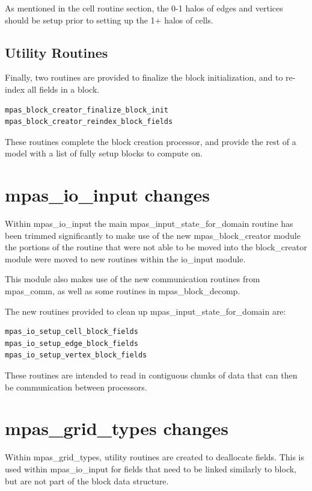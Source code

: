 \documentclass[11pt]{report}
\begin{document}
As mentioned in the cell routine section, the 0-1 halos of edges and vertices should be setup prior to setting up the 1+ halos of cells.

\subsection{Utility Routines}
Finally, two routines are provided to finalize the block initialization, and to re-index all fields in a block.

\begin{lstlisting}[language=fortran,escapechar=@,frame=single]
mpas_block_creator_finalize_block_init
mpas_block_creator_reindex_block_fields
\end{lstlisting}

These routines complete the block creation processor, and provide the rest of a model with a list of fully setup blocks to compute on.

\section{mpas\_io\_input changes}
Within mpas\_io\_input the main mpas\_input\_state\_for\_domain routine has been trimmed significantly to make use of the new mpas\_block\_creator module the portions of the routine that were not able to be moved into the block\_creator module were moved to new routines within the io\_input module.

This module also makes use of the new communication routines from mpas\_comm, as well as some routines in mpas\_block\_decomp.

The new routines provided to clean up mpas\_input\_state\_for\_domain are:
\begin{lstlisting}[language=fortran,escapechar=@,frame=single]
mpas_io_setup_cell_block_fields
mpas_io_setup_edge_block_fields
mpas_io_setup_vertex_block_fields
\end{lstlisting}
These routines are intended to read in contiguous chunks of data that can then be communication between processors.

\section{mpas\_grid\_types changes}
Within mpas\_grid\_types, utility routines are created to deallocate fields. This is used within mpas\_io\_input for fields that need to be linked similarly to block, but are not part of the block data structure.
\end{document}
